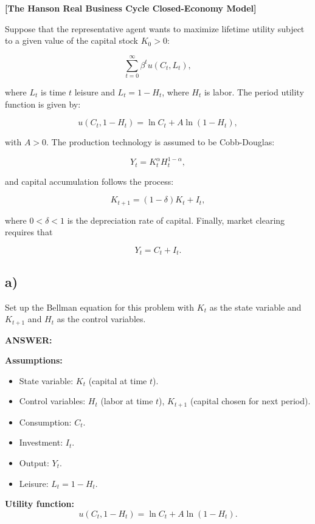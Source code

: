 \documentclass[12pt]{article}
\begin{document}
\textbf{[The Hanson Real Business Cycle Closed-Economy Model]}

Suppose that the representative agent wants to maximize lifetime utility subject to a given value of the capital stock \(K_0 > 0\):

\[
\sum_{t=0}^{\infty} \beta^t u(C_t, L_t),
\]

where \(L_t\) is time \(t\) leisure and \(L_t = 1 - H_t\), where \(H_t\) is labor. The period utility function is given by:

\[
u(C_t, 1 - H_t) = \ln C_t + A \ln (1 - H_t),
\]

with \(A > 0\). The production technology is assumed to be Cobb-Douglas:

\[
Y_t = K_t^{\alpha} H_t^{1-\alpha},
\]

and capital accumulation follows the process:

\[
K_{t+1} = (1-\delta)K_t + I_t,
\]

where \(0 < \delta < 1\) is the depreciation rate of capital. Finally, market clearing requires that

\[
Y_t = C_t + I_t.
\]

\subsection*{\noindent\textbf{a)}}

Set up the Bellman equation for this problem with \(K_t\) as the state variable and \(K_{t+1}\) and \(H_t\) as the control variables.


\vspace{0.5em}
\noindent\textcolor{formalred}{\textbf{ANSWER:}}

\noindent \textbf{Assumptions:}

\begin{itemize}
    \item State variable: \(K_t\) (capital at time \(t\)).
    \item Control variables: \(H_t\) (labor at time \(t\)), \(K_{t+1}\) (capital chosen for next period).
    \item Consumption: \(C_t\).
    \item Investment: \(I_t\).
    \item Output: \(Y_t\).
    \item Leisure: \(L_t = 1 - H_t\).
\end{itemize}

\noindent \textbf{Utility function:}
\[
u(C_t, 1 - H_t) = \ln C_t + A \ln (1 - H_t).
\]
\end{document}
